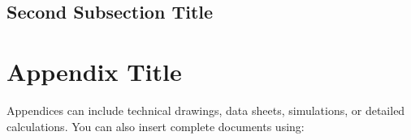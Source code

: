 \documentclass[11pt]{article}
\begin{document}
\subsection{Second Subsection Title}
\lipsum[13]

\clearpage
\renewcommand{\refname}{References}



\clearpage
\appendix
{}
\setcounter{page}{1}   %

\section{Appendix Title}
Appendices can include technical drawings, data sheets, simulations, or detailed calculations. You can also insert complete documents using:
\begin{verbatim}

\end{verbatim}


\end{document}
